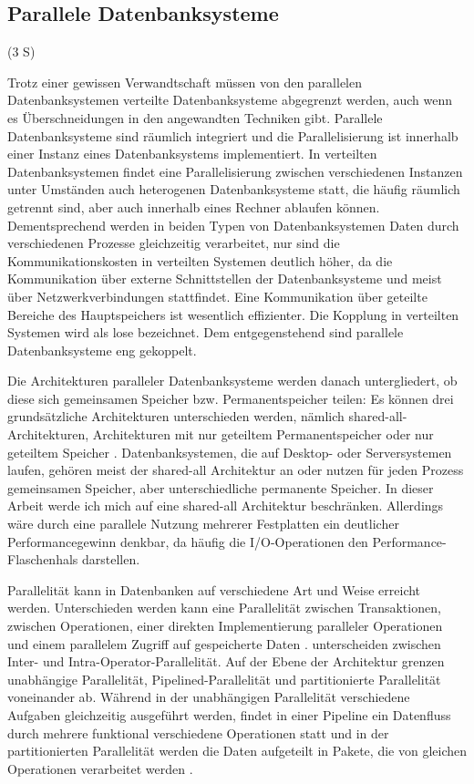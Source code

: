 \documentclass[a4paper,12pt,twoside]{article}
\begin{document}
{\subsection{Parallele Datenbanksysteme} (3 S)
\label{P_DBS} 

Trotz einer gewissen Verwandtschaft müssen von den parallelen Datenbanksystemen verteilte Datenbanksysteme abgegrenzt werden, auch wenn es Überschneidungen in den angewandten Techniken gibt. Parallele Datenbanksysteme sind räumlich integriert und die Parallelisierung ist innerhalb einer Instanz eines Datenbanksystems implementiert. In verteilten Datenbanksystemen findet eine Parallelisierung zwischen verschiedenen Instanzen unter Umständen auch heterogenen Datenbanksysteme statt, die häufig räumlich getrennt sind, aber auch innerhalb eines Rechner ablaufen können. Dementsprechend werden in beiden Typen von Datenbanksystemen Daten durch verschiedenen Prozesse gleichzeitig verarbeitet, nur sind die Kommunikationskosten in verteilten Systemen deutlich höher, da die Kommunikation über externe Schnittstellen der Datenbanksysteme und meist über Netzwerkverbindungen stattfindet. Eine Kommunikation über geteilte Bereiche des Hauptspeichers ist wesentlich effizienter. Die Kopplung in verteilten Systemen wird als lose bezeichnet. Dem entgegenstehend sind parallele Datenbanksysteme eng gekoppelt.

Die Architekturen paralleler Datenbanksysteme werden danach untergliedert, ob diese sich gemeinsamen Speicher bzw. Permanentspeicher teilen: Es können drei grundsätzliche Architekturen unterschieden werden, nämlich shared-all-Architekturen, Architekturen mit nur geteiltem Permanentspeicher oder nur geteiltem Speicher \parencite{Yu1998}. Datenbanksystemen, die auf Desktop- oder Serversystemen laufen, gehören meist der shared-all Architektur an oder nutzen für jeden Prozess gemeinsamen Speicher, aber unterschiedliche permanente Speicher. In dieser Arbeit werde ich mich auf eine shared-all Architektur beschränken. Allerdings wäre durch eine parallele Nutzung mehrerer Festplatten ein deutlicher Performancegewinn denkbar, da häufig die I/O-Operationen den Performance-Flaschenhals darstellen.

Parallelität kann in Datenbanken auf verschiedene Art und Weise erreicht werden. Unterschieden werden kann eine Parallelität zwischen Transaktionen, zwischen Operationen, einer direkten Implementierung paralleler Operationen und einem parallelem Zugriff auf gespeicherte Daten \parencite{Reuter1999}. \textcite [S. 1]{Yu1998} unterscheiden zwischen Inter- und Intra-Operator-Parallelität. Auf der Ebene der Architektur grenzen \textcite{Yu1998} unabhängige Parallelität, Pipelined-Parallelität und partitionierte Parallelität voneinander ab. Während in der unabhängigen Parallelität verschiedene Aufgaben gleichzeitig ausgeführt werden, findet in einer Pipeline ein Datenfluss durch mehrere funktional verschiedene Operationen statt und in der partitionierten Parallelität werden die Daten aufgeteilt in Pakete, die von gleichen Operationen verarbeitet werden \parencite{DeWitt1992}.

}
\end{document}
